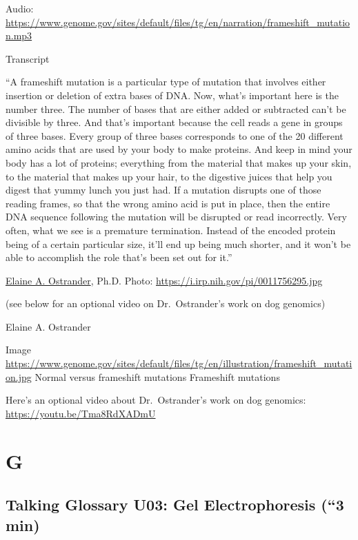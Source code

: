 \documentclass[
]{book}
\begin{document}
Audio: \url{https://www.genome.gov/sites/default/files/tg/en/narration/frameshift_mutation.mp3}

Transcript

``A frameshift mutation is a particular type of mutation that involves either insertion or deletion of extra bases of DNA. Now, what's important here is the number three. The number of bases that are either added or subtracted can't be divisible by three. And that's important because the cell reads a gene in groups of three bases. Every group of three bases corresponds to one of the 20 different amino acids that are used by your body to make proteins. And keep in mind your body has a lot of proteins; everything from the material that makes up your skin, to the material that makes up your hair, to the digestive juices that help you digest that yummy lunch you just had. If a mutation disrupts one of those reading frames, so that the wrong amino acid is put in place, then the entire DNA sequence following the mutation will be disrupted or read incorrectly. Very often, what we see is a premature termination. Instead of the encoded protein being of a certain particular size, it'll end up being much shorter, and it won't be able to accomplish the role that's been set out for it.''

\href{https://irp.nih.gov/pi/elaine-ostrander}{Elaine A. Ostrander}, Ph.D.
Photo: \url{https://i.irp.nih.gov/pi/0011756295.jpg}

(see below for an optional video on Dr.~Ostrander's work on dog genomics)

Elaine A. Ostrander

Image
\url{https://www.genome.gov/sites/default/files/tg/en/illustration/frameshift_mutation.jpg}
Normal versus frameshift mutations
Frameshift mutations

Here's an optional video about Dr.~Ostrander's work on dog genomics:
\url{https://youtu.be/Tma8RdXADmU}

\hypertarget{g}{%
\chapter{G}\label{g}}

\hypertarget{talking-glossary-u03-gel-electrophoresis-3-min}{%
\section{Talking Glossary U03: Gel Electrophoresis (``3 min)}\label{talking-glossary-u03-gel-electrophoresis-3-min}}
\end{document}
